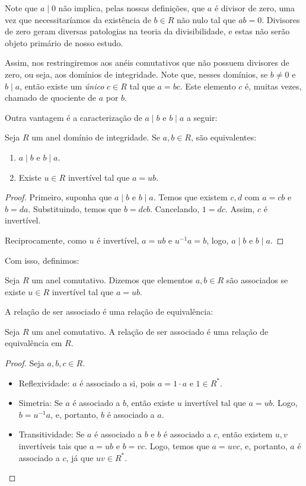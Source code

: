 Note que $a\mid 0$ não implica, pelas nossas definições, que $a$ é divisor de zero, uma vez que necessitaríamos da existência de $b \in R$ não nulo tal que $ab=0$.
Divisores de zero geram diversas patologias na teoria da divisibilidade, e estas não serão objeto primário de nosso estudo.

Assim, nos restringiremos aos anéis comutativos que não possuem divisores de zero, ou seja, aos domínios de integridade.
Note que, nesses domínios, se $b\neq 0$ e $b\mid a$, então existe um \emph{único} $c\in R$ tal que $a=bc$.
Este elemento $c$ é, muitas vezes, chamado de quociente de $a$ por $b$.

Outra vantagem é a caracterização de $a\mid b$ e $b\mid a$ a seguir:
\begin{prop}
    Seja $R$ um anel domínio de integridade. Se $a, b\in R$, são equivalentes:

    \begin{enumerate}
        \item $a\mid b$ e $b\mid a$.
        \item Existe $u \in R$ invertível tal que $a=ub$.
    \end{enumerate}

    \begin{proof}
        Primeiro, suponha que $a\mid b$ e $b\mid a$.
        Temos que existem $c, d$ com $a=cb$ e $b=da$.
        Substituindo, temos que $b=dcb$. Cancelando, $1=dc$. Assim, $c$ é invertível.

        Reciprocamente, como $u$ é invertível, $a=ub$ e $u^{-1}a=b$, logo, $a\mid b$ e $b\mid a$.
    \end{proof}
\end{prop}

Com isso, definimos:

\begin{definition}
Seja $R$ um anel comutativo.
Dizemos que elementos $a, b \in R$ são associados se existe $u \in R$ invertível tal que $a=ub$.
\end{definition}

A relação de ser associado é uma relação de equivalência:

\begin{lemma}
    Seja $R$ um anel comutativo. A relação de ser associado é uma relação de equivalência em $R$.
\end{lemma}
\begin{proof}
    Seja $a, b, c \in R$.
    \begin{itemize}
        \item Reflexividade: $a$ é associado a si, pois $a=1\cdot a$ e $1 \in R^*$.
        \item Simetria: Se $a$ é associado a $b$, então existe $u$ invertível tal que $a=ub$. Logo, $b=u^{-1}a$, e, portanto, $b$ é associado a $a$.
        \item Transitividade: Se $a$ é associado a $b$ e $b$ é associado a $c$, então existem $u, v$ invertíveis tais que $a=ub$ e $b=vc$.
        Logo, temos que $a=uvc$, e, portanto, $a$ é associado a $c$, já que $uv\in R^*$.
    \end{itemize}
\end{proof}

